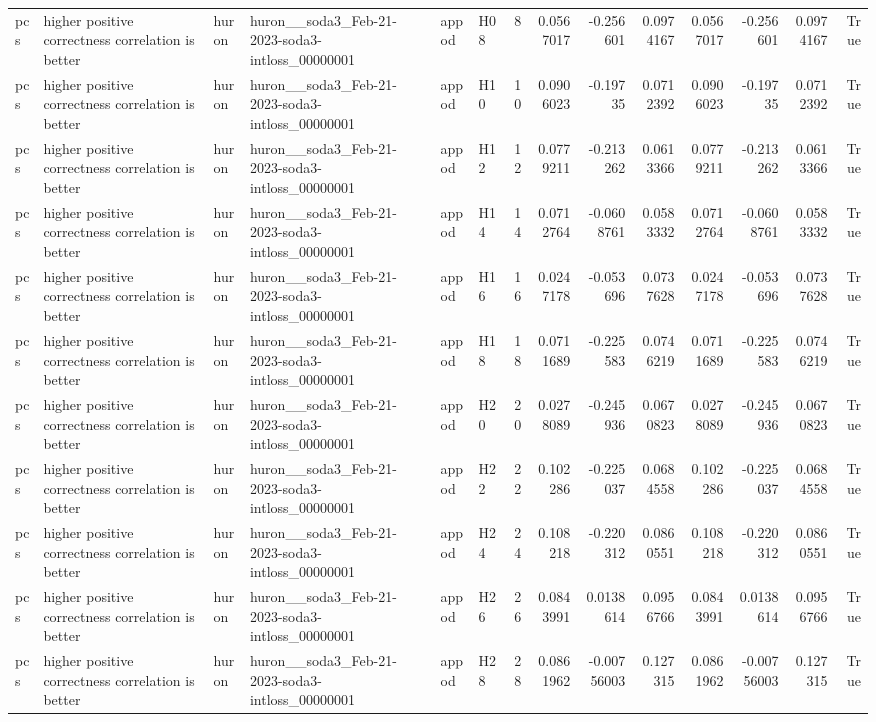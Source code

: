 \begin{longtable}{llllllrrrrrrrr}
pcs & higher positive correctness correlation is better & huron & huron\_\_soda3\_Feb-21-2023-soda3-intloss\_00000001 & appod & H08 & 8 & 0.0567017 & -0.256601 & 0.0974167 & 0.0567017 & -0.256601 & 0.0974167 & True \\
pcs & higher positive correctness correlation is better & huron & huron\_\_soda3\_Feb-21-2023-soda3-intloss\_00000001 & appod & H10 & 10 & 0.0906023 & -0.19735 & 0.0712392 & 0.0906023 & -0.19735 & 0.0712392 & True \\
pcs & higher positive correctness correlation is better & huron & huron\_\_soda3\_Feb-21-2023-soda3-intloss\_00000001 & appod & H12 & 12 & 0.0779211 & -0.213262 & 0.0613366 & 0.0779211 & -0.213262 & 0.0613366 & True \\
pcs & higher positive correctness correlation is better & huron & huron\_\_soda3\_Feb-21-2023-soda3-intloss\_00000001 & appod & H14 & 14 & 0.0712764 & -0.0608761 & 0.0583332 & 0.0712764 & -0.0608761 & 0.0583332 & True \\
pcs & higher positive correctness correlation is better & huron & huron\_\_soda3\_Feb-21-2023-soda3-intloss\_00000001 & appod & H16 & 16 & 0.0247178 & -0.053696 & 0.0737628 & 0.0247178 & -0.053696 & 0.0737628 & True \\
pcs & higher positive correctness correlation is better & huron & huron\_\_soda3\_Feb-21-2023-soda3-intloss\_00000001 & appod & H18 & 18 & 0.0711689 & -0.225583 & 0.0746219 & 0.0711689 & -0.225583 & 0.0746219 & True \\
pcs & higher positive correctness correlation is better & huron & huron\_\_soda3\_Feb-21-2023-soda3-intloss\_00000001 & appod & H20 & 20 & 0.0278089 & -0.245936 & 0.0670823 & 0.0278089 & -0.245936 & 0.0670823 & True \\
pcs & higher positive correctness correlation is better & huron & huron\_\_soda3\_Feb-21-2023-soda3-intloss\_00000001 & appod & H22 & 22 & 0.102286 & -0.225037 & 0.0684558 & 0.102286 & -0.225037 & 0.0684558 & True \\
pcs & higher positive correctness correlation is better & huron & huron\_\_soda3\_Feb-21-2023-soda3-intloss\_00000001 & appod & H24 & 24 & 0.108218 & -0.220312 & 0.0860551 & 0.108218 & -0.220312 & 0.0860551 & True \\
pcs & higher positive correctness correlation is better & huron & huron\_\_soda3\_Feb-21-2023-soda3-intloss\_00000001 & appod & H26 & 26 & 0.0843991 & 0.0138614 & 0.0956766 & 0.0843991 & 0.0138614 & 0.0956766 & True \\
pcs & higher positive correctness correlation is better & huron & huron\_\_soda3\_Feb-21-2023-soda3-intloss\_00000001 & appod & H28 & 28 & 0.0861962 & -0.00756003 & 0.127315 & 0.0861962 & -0.00756003 & 0.127315 & True \\

\end{longtable}
